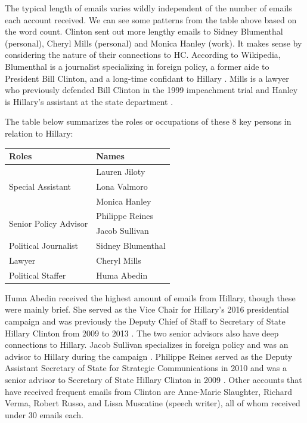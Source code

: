 The typical length of emails varies wildly independent of the number of emails each account received. We can see some patterns from the table above based on the word count. Clinton sent out more lengthy emails to Sidney Blumenthal (personal), Cheryl Mills (personal) and Monica Hanley (work). It makes sense by considering the nature of their connections to HC. 
According to Wikipedia, Blumenthal is a journalist specializing in foreign policy, a former aide to President Bill Clinton, and a long-time confidant to Hillary \cite{sidney2016}. Mills is a lawyer who previously defended Bill Clinton in the 1999 impeachment trial \cite{sidney2016} and Hanley is Hillary's assistant at the state department \cite{zimmermankey2016}.

The table below summarizes the roles or occupations of these 8 key persons in relation to Hillary:

\begin{center}
  \begin{tabular}[h]{|l|l|} 
    \hline
    Roles & Names  \\
    \hline
    \multirow{3}{*}{Special Assistant} 
          & Lauren Jiloty \\ 
          & Lona Valmoro \\ 
          & Monica Hanley  \\ 
    \hline
    \multirow{2}{*}{Senior Policy Advisor} 
          & Philippe Reines \\
          & Jacob Sullivan \\ 
    \hline
    \multirow{1}{*}{Political Journalist} 
          & Sidney Blumenthal \\ 
    \hline
    \multirow{1}{*}{Lawyer} 
          & Cheryl Mills \\
    \hline
    \multirow{1}{*}{Political Staffer} 
          & Huma Abedin \\ 
    \hline
  \end{tabular}
\end{center}

Huma Abedin received the highest amount of emails from Hillary, though these were mainly brief. She served as the Vice Chair for Hillary's 2016 presidential campaign and was previously the Deputy Chief of Staff to Secretary of State Hillary Clinton from 2009 to 2013 \cite{huma2016}. The two senior advisors also have deep connections to Hillary. Jacob Sullivan specializes in foreign policy and was an advisor to Hillary during the campaign \cite{jake2016}. Philippe Reines served as the Deputy Assistant Secretary of State for Strategic Communications in 2010 and was a senior advisor to Secretary of State Hillary Clinton in 2009 \cite{philippe2016}. Other accounts that have received frequent emails from Clinton are Anne-Marie Slaughter, Richard Verma, Robert Russo, and Lissa Muscatine (speech writer), all of whom received under 30 emails each. 

